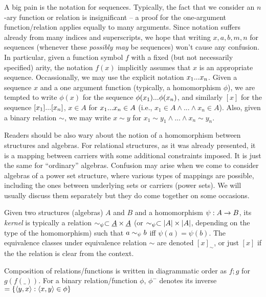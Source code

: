 \documentclass[10pt]{article}
\begin{document}
A big pain is the notation for sequences. Typically, the fact that we consider
an $n$-ary function or relation is insignificant -- a proof for 
the one-argument function/relation applies equally to many arguments. 
Since notation suffers already from many indices and superscripts, we hope that 
writing $x,a,b,m,n$ for sequences (whenever these {\em possibly may} be sequences)
won't cause any confusion.
In particular, given a function symbol $f$ with a fixed (but
not necessarily specified)
arity, the notation $f(x)$ implicitly assumes that $x$ is an appropriate sequence.
Occassionally, we may use the explicit notation $x_{1}...x_{n}$.
Given a sequence $x$ and a one argument function (typically, a homomorphism
 $\phi$), we are tempted to write $\phi(x)$ for the sequence
$\phi(x_{1})...\phi(x_{n})$, and similarly $[x]$ for the sequence $[x_{1}]...[x_{n}]$, 
$x\in A$ for $x_{1}...x_{n}\in A$ (i.e., $x_1\in A\land...\land x_n\in A$).
Also, given a binary relation $\sim$, 
we may write $x\sim y$ for $x_1\sim y_1 \land...\land x_n\sim y_n$.

Readers should be also wary about the notion of a homomorphism between
structures and algebras. For relational structures, as it was already
presented, it is a mapping between carriers with some additional
constraints imposed. It is just the same for ``ordinary''
algebras. Confusion may arise when we come to consider algebras
of a power set structure, where various types of mappings are possible,
including the ones between underlying sets or carriers (power
sets). We will usually discuss them separately but they do come
together on some occasions. 

Given two structures (algebras) $A$ and $B$ and a homomorphism $\psi :
A \rightarrow B$, its {\em kernel\/} is typically a relation
$\sim_\psi \subset \underline {A}\times\underline {A}$ 
(or $\sim_\psi \subset |A|\times |A|$, depending on the type of the 
homomorphism) such that
$a\sim_\psi b$ iff $\psi(a)=\psi(b)$. The equivalence classes under
equivalence relation $\sim$ are denoted $[x]_\sim$, or just $[x]$ if 
the the relation is clear from the context.

Composition of relations/functions is written in diagrammatic order
as $f;g$ for $g(f(\_))$. For a binary relation/function $\phi$, $\phi^-$
 denotes its inverse $=\{\langle y,x\rangle:\langle x,y\rangle\in\phi\}$


\end{document}
